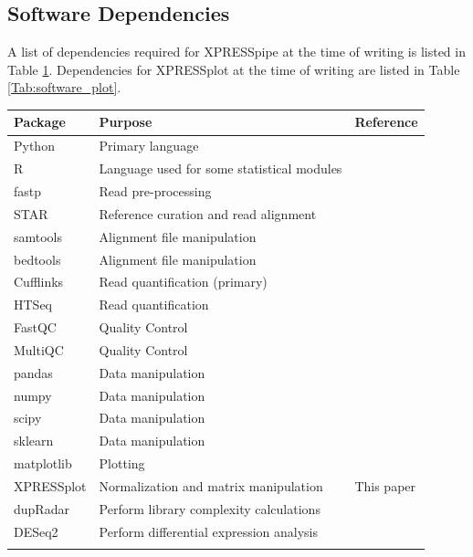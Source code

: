 \documentclass[10pt, oneside]{article}
\begin{document}
\subsection{Software Dependencies}
A list of dependencies required for XPRESSpipe at the time of writing is listed in Table \ref{Tab:software_pipe}. Dependencies for XPRESSplot at the time of writing are listed in Table \ref{Tab:software_plot}.

\begin{table}[!]
    \centering
{}
\begin{tabular}{p{2.4cm}p{7.5cm}p{3cm}}
 \textbf{Package} & \textbf{Purpose} & \textbf{Reference} \\
 \hline
 Python & Primary language & \\
 \hline
 R & Language used for some statistical modules & \\
 \hline
 fastp & Read pre-processing & \cite{fastp} \\
 \hline
 STAR & Reference curation and read alignment & \cite{star} \\
 \hline
 samtools & Alignment file manipulation & \cite{samtools} \\
 \hline
 bedtools & Alignment file manipulation & \cite{bedtools} \\
 \hline
 Cufflinks & Read quantification (primary) & \cite{cufflinks} \\
 \hline
 HTSeq & Read quantification & \cite{htseq} \\
 \hline
 FastQC & Quality Control & \cite{fastqc} \\
 \hline
 MultiQC & Quality Control & \cite{multiqc} \\
 \hline
 pandas & Data manipulation & \cite{pandas} \\
 \hline
 numpy & Data manipulation & \cite{numpy1, numpy2} \\
 \hline
 scipy & Data manipulation & \cite{scipy} \\
 \hline
 sklearn & Data manipulation & \cite{sklearn} \\
 \hline
 matplotlib & Plotting & \cite{matplotlib} \\
 \hline
 XPRESSplot & Normalization and matrix manipulation & This paper \\
 \hline
 dupRadar & Perform library complexity calculations & \cite{dupradar} \\
 \hline
 DESeq2 & Perform differential expression analysis & \cite{deseq2} \\
 \label{Tab:software_pipe}
\end{tabular}
\end{table}
\end{document}
